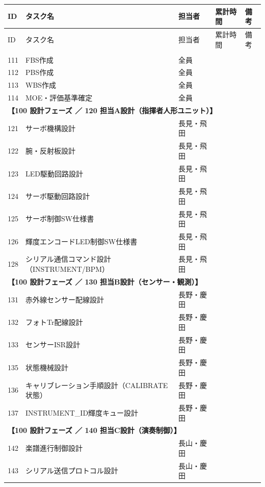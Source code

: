 \begingroup
\small
\begin{longtable}{p{0.9cm}p{7cm}p{2.5cm}p{2cm}p{2cm}}
\toprule
ID & タスク名 & 担当者 & 累計時間 & 備考 \\
\midrule
\endfirsthead

\toprule
ID & タスク名 & 担当者 & 累計時間 & 備考 \\
\midrule
\endhead

\bottomrule
\endfoot

\multicolumn{5}{l}{\textbf{【100 設計フェーズ ／ 110 共通設計】}} \\
\midrule
111 & FBS作成 & 全員 &  &  \\
112 & PBS作成 & 全員 &  &  \\
113 & WBS作成 & 全員 &  &  \\
114 & MOE・評価基準確定 & 全員 &  &  \\
\midrule
\multicolumn{5}{l}{\textbf{【100 設計フェーズ ／ 120 担当A設計（指揮者人形ユニット）】}} \\
\midrule
121 & サーボ機構設計 & 長見・飛田 &  &  \\
122 & 腕・反射板設計 & 長見・飛田 &  &  \\
123 & LED駆動回路設計 & 長見・飛田 &  &  \\
124 & サーボ駆動回路設計 & 長見・飛田 &  &  \\
125 & サーボ制御SW仕様書 & 長見・飛田 &  &  \\
126 & 輝度エンコードLED制御SW仕様書 & 長見・飛田 &  &  \\
128 & シリアル通信コマンド設計（INSTRUMENT/BPM） & 長見・飛田 &  &  \\
\midrule
\multicolumn{5}{l}{\textbf{【100 設計フェーズ ／ 130 担当B設計（センサー・観測）】}} \\
\midrule
131 & 赤外線センサー配線設計 & 長野・慶田 &  &  \\
132 & フォトTr配線設計 & 長野・慶田 &  &  \\
133 & センサーISR設計 & 長野・慶田 &  &  \\
135 & 状態機械設計 & 長野・慶田 &  &  \\
136 & キャリブレーション手順設計（CALIBRATE状態） & 長野・慶田 &  &  \\
137 & INSTRUMENT\_ID輝度キュー設計 & 長野・慶田 &  &  \\
\midrule
\multicolumn{5}{l}{\textbf{【100 設計フェーズ ／ 140 担当C設計（演奏制御）】}} \\
\midrule
142 & 楽譜進行制御設計 & 長山・慶田 &  &  \\
143 & シリアル送信プロトコル設計 & 長山・慶田 &  &  \\

\end{longtable}
